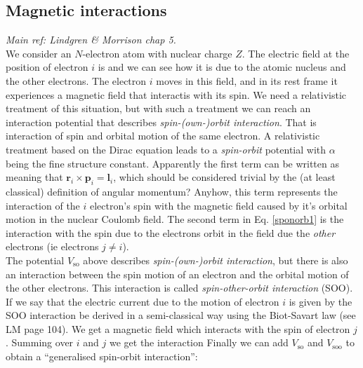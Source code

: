\subsection{Magnetic interactions}
\emph{Main ref: Lindgren \& Morrison chap 5.}\\
We consider an $N$-electron atom with nuclear charge $Z$. The electric field at the position of electron $i$ is
and we can see how it is due to the atomic nucleus and the other electrons. The electron $i$ moves in this field, and in its rest frame it experiences a magnetic field that interactis with its spin. We need a relativistic treatment of this situation, but with such a treatment we can reach an interaction potential that describes \emph{spin-(own-)orbit interaction}. That is interaction of spin and orbital motion of the same electron. A relativistic treatment based on the Dirac equation leads to a \emph{spin-orbit} potential
with $\alpha$ being the fine structure constant. Apparently the first term can be written
as 
meaning that $ \bm{r}_i \times \bm{p}_i = \bm{l}_i$, which should be considered trivial by the (at least classical) definition of angular momentum? Anyhow, this term represents the interaction of the $i$ electron's spin with the magnetic field caused by it's orbital motion in the nuclear Coulomb field. The second term in Eq. \eqref{sponorb1} is the interaction with the spin due to the electrons orbit in the field due the \emph{other} electrons (ie electrons $j \neq i$).\\
\indent The potential $V_{\text{so}}$ above describes \emph{spin-(own-)orbit interaction}, but there is also an interaction between the spin motion of an electron and the orbital motion of the other electrons. This interaction is called \emph{spin-other-orbit interaction} (SOO). If we say that the electric current due to the motion of electron $i$ is given by
the SOO interaction be derived in a semi-classical way using the Biot-Savart law (see LM page 104). We get a magnetic field
which interacts with the spin of electron $j$. Summing over $i$ and $j$ we get the interaction
Finally we can add $V_{\text{so}}$ and $V_{\text{soo}}$ to obtain a ``generalised spin-orbit interaction'':

